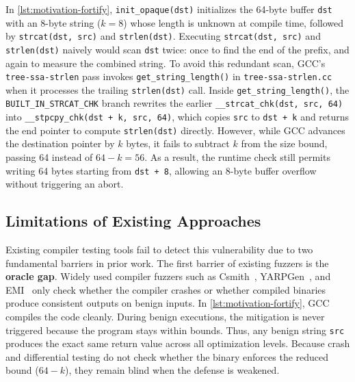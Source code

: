 \documentclass[conference,compsoc]{IEEEtran}
\begin{document}
In \autoref{lst:motivation-fortify}, \texttt{init\_opaque(dst)} initializes the 64-byte buffer \texttt{dst} with an 8-byte string ($k = 8$) whose length is unknown at compile time, followed by \texttt{strcat(dst, src)} and \texttt{strlen(dst)}. Executing \texttt{strcat(dst, src)} and \texttt{strlen(dst)} naively would scan \texttt{dst} twice: once to find the end of the prefix, and again to measure the combined string. To avoid this redundant scan, GCC's \texttt{tree-ssa-strlen} pass invokes \texttt{get\_string\_length()} in \texttt{tree-ssa-strlen.cc} when it processes the trailing \texttt{strlen(dst)} call. Inside \texttt{get\_string\_length()}, the \texttt{BUILT\_IN\_STRCAT\_CHK} branch rewrites the earlier \texttt{\_\_strcat\_chk(dst, src, 64)} into \texttt{\_\_stpcpy\_chk(dst + k, src, 64)}, which copies \texttt{src} to \texttt{dst + k} and returns the end pointer to compute \texttt{strlen(dst)} directly. However, while GCC advances the destination pointer by $k$ bytes, it fails to subtract $k$ from the size bound, passing 64 instead of $64 - k = 56$. As a result, the runtime check still permits writing 64 bytes starting from \texttt{dst + 8}, allowing an 8-byte buffer overflow without triggering an abort.

\subsection{Limitations of Existing Approaches}\label{sec:limitations}

Existing compiler testing tools fail to detect this vulnerability due to two fundamental barriers in prior work. The first barrier of existing fuzzers is the \textbf{oracle gap}. Widely used compiler fuzzers such as Csmith~\cite{yang2011csmith}, YARPGen~\cite{livinskii2020yarpgen}, and EMI~\cite{le2014emi} only check whether the compiler crashes or whether compiled binaries produce consistent outputs on benign inputs. In \autoref{lst:motivation-fortify}, GCC compiles the code cleanly. During benign executions, the mitigation is never triggered because the program stays within bounds. Thus, any benign string \texttt{src} produces the exact same return value across all optimization levels. Because crash and differential testing do not check whether the binary enforces the reduced bound ($64 - k$), they remain blind when the defense is weakened.
\end{document}
